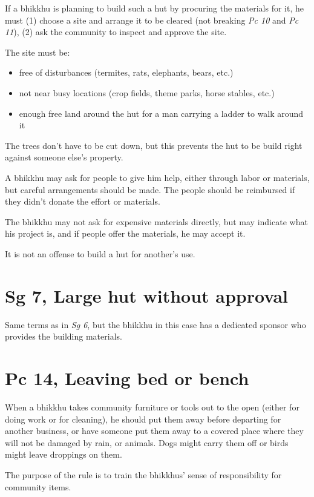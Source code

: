 If a bhikkhu is planning to build such a hut by procuring the materials
for it, he must (1) choose a site and arrange it to be cleared (not
breaking \emph{Pc 10} and \emph{Pc 11}), (2) ask the community to
inspect and approve the site.

The site must be:

\begin{itemize}
\tightlist
\item
  free of disturbances (termites, rats, elephants, bears, etc.)
\item
  not near busy locations (crop fields, theme parks, horse stables,
  etc.)
\item
  enough free land around the hut for a man carrying a ladder to walk
  around it
\end{itemize}

The trees don't have to be cut down, but this prevents the hut to be
build right against someone else's property.

A bhikkhu may ask for people to give him help, either through labor or
materials, but careful arrangements should be made. The people should be
reimbursed if they didn't donate the effort or materials.

The bhikkhu may not ask for expensive materials directly, but may
indicate what his project is, and if people offer the materials, he may
accept it.

It is not an offense to build a hut for another's use.

\section{Sg 7, Large hut without approval}

Same terms as in \emph{Sg 6}, but the bhikkhu in this case has a
dedicated sponsor who provides the building materials.

\section{Pc 14, Leaving bed or bench}

When a bhikkhu takes community furniture or tools out to the open
(either for doing work or for cleaning), he should put them away before
departing for another business, or have someone put them away to a
covered place where they will not be damaged by rain, or animals. Dogs
might carry them off or birds might leave droppings on them.

The purpose of the rule is to train the bhikkhus' sense of
responsibility for community items.

